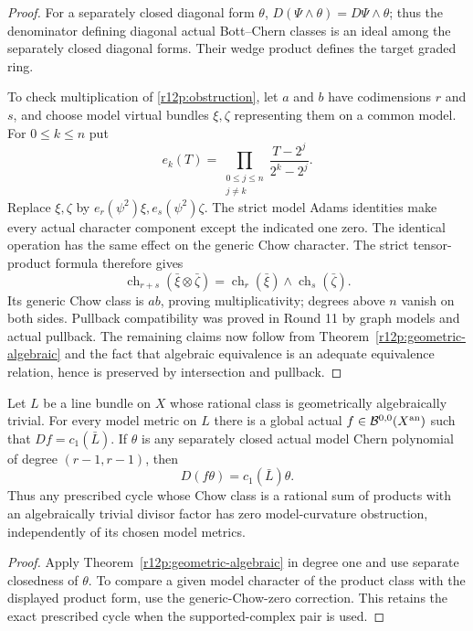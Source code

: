 \begin{proof}
For a separately closed diagonal form $\theta$,
$D(\Psi\wedge\theta)=D\Psi\wedge\theta$; thus the denominator
defining diagonal actual Bott--Chern classes is an ideal among the
separately closed diagonal forms.  Their wedge product defines the
target graded ring.

To check multiplication of \eqref{r12p:obstruction}, let $a$ and $b$
have codimensions $r$ and $s$, and choose model virtual bundles
$\xi,\zeta$ representing them on a common model.  For
$0\leq k\leq n$ put
\[
 e_k(T)=\prod_{\substack{0\leq j\leq n\\j\ne k}}
                         \frac{T-2^j}{2^k-2^j}.
\]
Replace $\xi,\zeta$ by $e_r(\psi^2)\xi,e_s(\psi^2)\zeta$.
The strict model Adams identities make every actual character
component except the indicated one zero.  The identical operation
has the same effect on the generic Chow character.  The strict
tensor-product formula therefore gives
\[
 \operatorname{ch}_{r+s}(\bar\xi\otimes\bar\zeta)
       =\operatorname{ch}_r(\bar\xi)
                             \wedge\operatorname{ch}_s(\bar\zeta).
\]
Its generic Chow class is $ab$, proving multiplicativity; degrees
above $n$ vanish on both sides.  Pullback compatibility was proved
in Round 11 by graph models and actual pullback.  The remaining
claims now follow from Theorem~\ref{r12p:geometric-algebraic} and
the fact that algebraic equivalence is an adequate equivalence
relation, hence is preserved by intersection and pullback.
\end{proof}

\begin{corollary}
\label{r12p:picard-products}
Let $L$ be a line bundle on $X$ whose rational class is geometrically
algebraically trivial.  For every model metric on $L$ there is a
global actual $f\in\mathcal B^{0,0}(X^{\rm an})$ such that
$Df=c_1(\bar L)$.  If $\theta$ is any separately closed actual
model Chern polynomial of degree $(r-1,r-1)$, then
\[
                       D(f\theta)=c_1(\bar L)\theta.
\tag{R12.P16}\label{r12p:picard-primitive}
\]
Thus any prescribed cycle whose Chow class is a rational sum of
products with an algebraically trivial divisor factor has zero
model-curvature obstruction, independently of its chosen model
metrics.
\end{corollary}

\begin{proof}
Apply Theorem~\ref{r12p:geometric-algebraic} in degree one and use
separate closedness of $\theta$.  To compare a given model character
of the product class with the displayed product form, use the
generic-Chow-zero correction.  This retains the exact prescribed
cycle when the supported-complex pair is used.
\end{proof}

